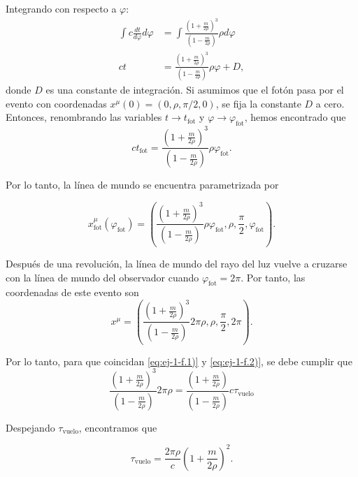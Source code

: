 \documentclass[letterpaper,11pt]{article}
\begin{document}
Integrando con respecto a $\varphi$:
\begin{align}
\int c \frac{dt}{d\varphi} d\varphi &= \int \frac{\left(1 + \frac{m}{2\rho}\right)^3}{\left(1 - \frac{m}{2\rho}\right)} \rho d\varphi \\
ct &= \frac{\left(1 + \frac{m}{2\rho}\right)^3}{\left(1 - \frac{m}{2\rho}\right)} \rho \varphi + D,
\end{align}
donde $D$ es una constante de integración. Si asumimos que el fotón pasa por el evento con coordenadas $x^{\mu}(0) = (0,\rho,\pi/2,0)$, se fija la constante $D$ a cero. Entonces, renombrando las variables $t \to t_{\text{fot}}$ y $\varphi\to\varphi_{\text{fot}}$, hemos encontrado que
\begin{equation}
ct_{\text{fot}} = \frac{\left(1 + \frac{m}{2\rho}\right)^3}{\left(1 - \frac{m}{2\rho}\right)} \rho \varphi_{\text{fot}}.
\end{equation}

Por lo tanto, la línea de mundo se encuentra parametrizada por
\begin{shaded}
\begin{equation}
x_{\text{fot}}^{\mu}(\varphi_{\text{fot}}) = \left(\frac{\left(1 + \frac{m}{2\rho}\right)^3}{\left(1 - \frac{m}{2\rho}\right)} \rho \varphi_{\text{fot}},\rho,\frac{\pi}{2},\varphi_{\text{fot}} \right). \label{eq:ej-1-f.2)}
\end{equation}
\end{shaded}

Después de una revolución, la línea de mundo del rayo del luz vuelve a cruzarse con la línea de mundo del observador cuando $\varphi_{\text{fot}} = 2\pi$. Por tanto, las coordenadas de este evento son
\begin{equation}
x^{\mu} = \left(\frac{\left(1 + \frac{m}{2\rho}\right)^3}{\left(1 - \frac{m}{2\rho}\right)} 2\pi \rho,\rho,\frac{\pi}{2},2\pi\right). \label{eq:ej-1-f.3)}
\end{equation}

Por lo tanto, para que coincidan \eqref{eq:ej-1-f.1)} y \eqref{eq:ej-1-f.2)}, se debe cumplir que
\begin{equation}
\frac{\left(1 + \frac{m}{2\rho}\right)^3}{\left(1 - \frac{m}{2\rho}\right)} 2\pi \rho = \frac{\left(1 + \frac{m}{2\rho}\right)}{\left(1 - \frac{m}{2\rho}\right)} c \tau_{\text{vuelo}}
\end{equation}  

Despejando $\tau_{\text{vuelo}}$, encontramos que 
\begin{shaded}
\begin{equation}
\tau_{\text{vuelo}} = \frac{2\pi \rho}{c} \left(1 + \frac{m}{2\rho}\right)^2. \label{eq:ej-1-f.4)}
\end{equation}
\end{shaded}
\end{document}
